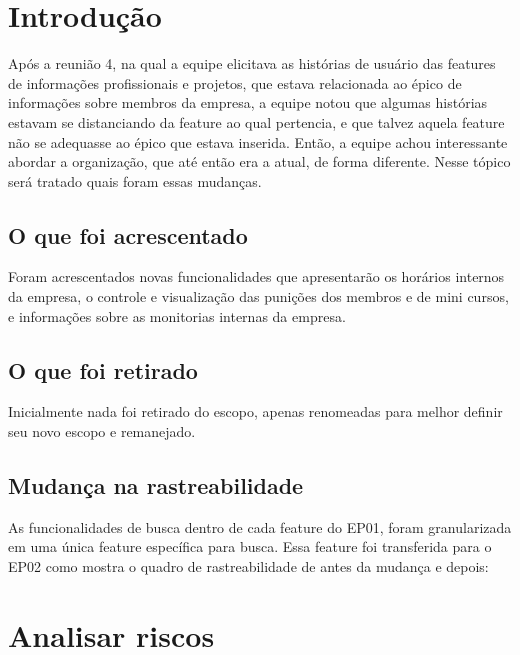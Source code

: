 \begin{anexosenv}
\section[Intodução]{Introdução}

Após a reunião 4, na qual a equipe elicitava as histórias de usuário das features de informações profissionais e projetos, que estava relacionada ao épico de informações sobre membros da empresa, a equipe notou que algumas histórias estavam se distanciando da feature ao qual pertencia, e que talvez aquela feature não se adequasse ao épico que estava inserida. Então, a equipe achou interessante abordar a organização, que até então era a atual, de forma diferente. Nesse tópico será tratado quais foram essas mudanças.\\

\subsection[O que foi acrescentado]{O que foi acrescentado}

Foram acrescentados novas funcionalidades que apresentarão os horários internos da empresa, o controle e visualização das punições dos membros e de mini cursos, e  informações sobre as monitorias internas da empresa.\\

\subsection[O que foi retirado]{O que foi retirado}

Inicialmente nada foi retirado do escopo, apenas renomeadas para melhor definir seu novo escopo e remanejado.\\

\subsection[Mudança na rastreabilidade]{Mudança na rastreabilidade}

As funcionalidades de busca dentro de cada feature do EP01, foram granularizada em uma única feature específica para busca. Essa feature foi transferida para o EP02 como mostra o quadro de rastreabilidade de antes da mudança e depois: \\

\section[Analisar riscos]{Analisar riscos}


\end{anexosenv}
